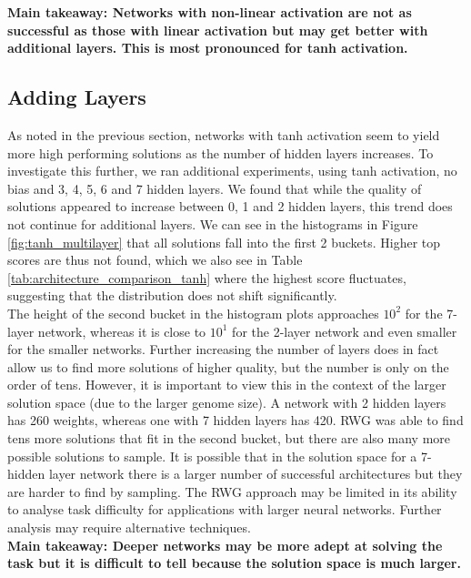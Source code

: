 \documentclass[12pt]{article}
\begin{document}
\textbf{Main takeaway: Networks with non-linear activation are not as successful as those with linear activation but may get better with additional layers. 
This is most pronounced for tanh activation. }

\subsection{Adding Layers} \label{tanh_multilayer}

As noted in the previous section, networks with tanh activation seem to yield more high performing solutions as the number of hidden layers increases. 
To investigate this further, we ran additional experiments, using tanh activation, no bias and 3, 4, 5, 6 and 7 hidden layers.
We found that while the quality of solutions appeared to increase between 0, 1 and 2 hidden layers, this trend does not continue for additional layers.
We can see in the histograms in Figure \ref{fig:tanh_multilayer} that all solutions fall into the first 2 buckets.
Higher top scores are thus not found, which we also see in Table \ref{tab:architecture_comparison_tanh} where the highest score fluctuates, suggesting that the distribution does not shift significantly.\\

The height of the second bucket in the histogram plots approaches $10^2$ for the 7-layer network, whereas it is close to $10^1$ for the 2-layer network and even smaller for the smaller networks.
Further increasing the number of layers does in fact allow us to find more solutions of higher quality, but the number is only on the order of tens.
However, it is important to view this in the context of the larger solution space (due to the larger genome size).
A network with 2 hidden layers has 260 weights, whereas one with 7 hidden layers has 420.
RWG was able to find tens more solutions that fit in the second bucket, but there are also many more possible solutions to sample. 
It is possible that in the solution space for a 7-hidden layer network there is a larger number of successful architectures but they are harder to find by sampling. 
The RWG approach may be limited in its ability to analyse task difficulty for applications with larger neural networks.
Further analysis may require alternative techniques.\\

\textbf{Main takeaway: Deeper networks may be more adept at solving the task but it is difficult to tell because the solution space is much larger. }
\end{document}
